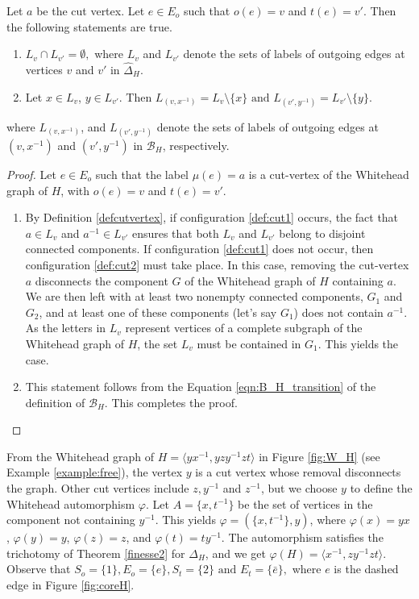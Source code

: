 \documentclass{article}
\newcommand{\B}{\mathcal{B}}
\begin{document}
{\mypro \label{pro:labels} Let $a$ be the cut vertex. Let $e \in E_o$ such that $o(e) = v$ and $t(e) = v'$. Then the following statements are true.
\begin{enumerate}
    \item \label{pro_case1} $L_v \cap L_{v'} = \emptyset,$ where $L_v$ and $ L_{v'}$ denote the sets of labels of outgoing edges at vertices $v$ and $v'$ in $\widehat{\Delta}_H.$
    \item \label{pro_case2} Let $x \in L_v$, $y \in L_{v'}$. Then $L_{(v,x^{-1})} = L_v\setminus\{x\} \textrm{ and } L_{(v',y^{-1})} = L_{v'}\setminus\{y\} .$
\end{enumerate} where $L_{(v,x^{-1})}$, and $L_{(v',y^{-1})}$ denote the sets of labels of outgoing edges at $(v,x^{-1})$ and $(v',y^{-1})$ in $\B_H$, respectively.}
\begin{proof}
    Let $e \in E_o$ such that the label $\mu(e) = a$ is a cut-vertex of the Whitehead graph of $H$, with $o(e) = v$ and $t(e) = v'$. 
    \begin{enumerate}
    \item By Definition \ref{defcutvertex}, if configuration \ref{def:cut1} occurs, the fact that $a \in L_v$ and $a^{-1} \in L_{v'}$ ensures that both $L_v$ and $L_{v'}$ belong to disjoint connected components. If configuration \ref{def:cut1} does not occur, then configuration \ref{def:cut2} must take place. In this case, removing the cut-vertex $a$ disconnects the component $G$ of the Whitehead graph of $H$ containing $a$. We are then left with at least two nonempty connected components, $G_1$ and $G_2$, and at least one of these components (let's say $G_1$) does not contain $a^{-1}$. As the letters in $L_v$ represent vertices of a complete subgraph of the Whitehead graph of $H$, the set $L_v$ must be contained in $G_1$. This yields the case. 
    \item This statement follows from the Equation \eqref{eqn:B_H_transition} of the definition of $\B_H$. This completes the proof.
\end{enumerate}
\end{proof}

{\myexa \label{example:freeH} From the Whitehead graph of $H = \langle yx^{-1}, yzy^{-1}zt\rangle$ in Figure \ref{fig:W_H} (see Example \ref{example:free}), the vertex $y$ is a cut vertex whose removal disconnects the graph. Other cut vertices include $z, y^{-1}$ and $z^{-1}$, but we choose $y$ to define the Whitehead automorphism $\varphi$. Let $A = \{x, t^{-1}\}$ be the set of vertices in the component not containing $y^{-1}$. This yields $\varphi = (\{x, t^{-1}\}, y)$, where $\varphi(x) = yx$, $\varphi(y) = y$, $\varphi(z) = z$, and $\varphi(t) = ty^{-1}$. The automorphism satisfies the trichotomy of Theorem \ref{finesse2} for $\Delta_H$, and we get $\varphi(H) = \langle x^{-1}, zy^{-1}zt\rangle$. Observe that $S_o = \{1\},E_o = \{e\}, S_t = \{2\} \textrm{ and } E_t = \{\bar{e}\},$ where $e$ is the dashed edge in Figure \ref{fig:coreH}.}
\end{document}
